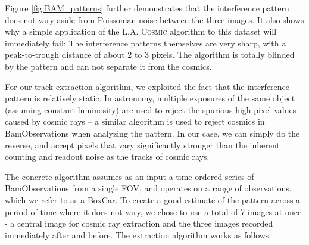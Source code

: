 \documentclass[a4paper, 11pt]{article}
\begin{document}
Figure \ref{fig:BAM_patterns} further demonstrates that the interference pattern does not vary aside from Poissonian noise between the three images. It also shows why a simple application of the \textsc{L.A. Cosmic} algorithm to this dataset will immediately fail: The interference patterns themselves are very sharp, with a peak-to-trough distance of about 2 to 3 pixels. The algorithm is totally blinded by the pattern and can not separate it from the cosmics.

For our track extraction algorithm, we exploited the fact that the interference pattern is relatively static. In astronomy, multiple exposures of the same object (assuming constant luminosity) are used to reject the spurious high pixel values caused by cosmic rays -- a similar algorithm is used to reject cosmics in BamObservations when analyzing the pattern. In our case, we can simply do the reverse, and accept pixels that vary significantly stronger than the inherent counting and readout noise as the tracks of cosmic rays.

The concrete algorithm assumes as an input a time-ordered series of BamObservations from a single FOV, and operates on a range of observations, which we refer to as a BoxCar. To create a good estimate of the pattern across a period of time where it does not vary, we chose to use a total of 7 images at once - a central image for cosmic ray extraction and the three images recorded immediately after and before. The extraction algorithm works as follows.
\end{document}
